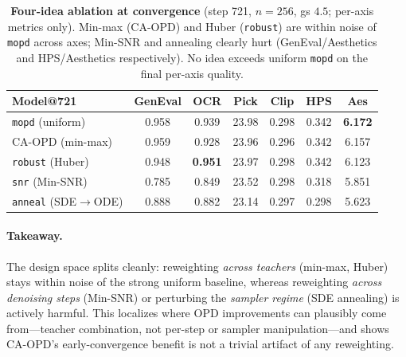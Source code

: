\begin{table}[t]
\centering
\caption{\textbf{Four-idea ablation at convergence} (step 721, $n{=}256$, gs
$4.5$; per-axis metrics only). Min-max (CA-OPD) and Huber (\texttt{robust}) are
within noise of \texttt{mopd} across axes; Min-SNR and annealing clearly hurt
(GenEval/Aesthetics and HPS/Aesthetics respectively). No idea exceeds uniform
\texttt{mopd} on the final per-axis quality.}
\label{tab:ablation}
\small
\setlength{\tabcolsep}{5pt}
\begin{tabular}{lcccccc}
\toprule
\textbf{Model}@721 & \textbf{GenEval} & \textbf{OCR} & \textbf{Pick} & \textbf{Clip} & \textbf{HPS} & \textbf{Aes} \\
\midrule
\texttt{mopd} (uniform)        & 0.958 & 0.939 & 23.98 & 0.298 & 0.342 & \textbf{6.172} \\
CA-OPD (min-max)               & 0.959 & 0.928 & 23.96 & 0.296 & 0.342 & 6.157 \\
\texttt{robust} (Huber)        & 0.948 & \textbf{0.951} & 23.97 & 0.298 & 0.342 & 6.123 \\
\texttt{snr} (Min-SNR)         & 0.785 & 0.849 & 23.52 & 0.298 & 0.318 & 5.851 \\
\texttt{anneal} (SDE$\to$ODE)  & 0.888 & 0.882 & 23.14 & 0.297 & 0.298 & 5.623 \\
\bottomrule
\end{tabular}
\end{table}

\paragraph{Takeaway.}
The design space splits cleanly: reweighting \emph{across teachers} (min-max,
Huber) stays within noise of the strong uniform baseline, whereas reweighting
\emph{across denoising steps} (Min-SNR) or perturbing the \emph{sampler regime}
(SDE annealing) is actively harmful. This localizes where OPD improvements can
plausibly come from---teacher combination, not per-step or sampler
manipulation---and shows CA-OPD's early-convergence benefit is not a trivial
artifact of any reweighting.
